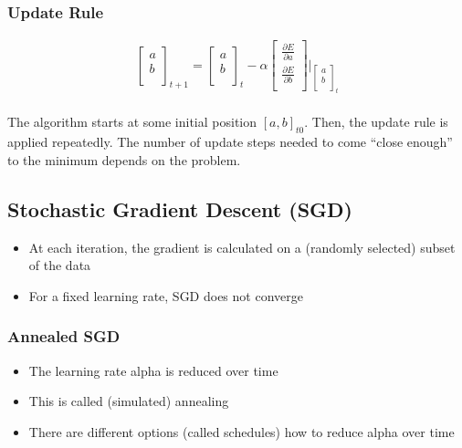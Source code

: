 \subsubsection{Update Rule}
\begin{align}
   \begin{bmatrix}
           a \\
           b \\
         \end{bmatrix}_{t+1} 
         =    \begin{bmatrix}
           a \\
           b \\
         \end{bmatrix}_{t} - \alpha 
         \begin{bmatrix}
           \frac{\partial E}{\partial a} \\
           \frac{\partial E}{\partial b} \\
         \end{bmatrix} \Big\rvert _{\begin{bmatrix}
           a \\
           b \\
         \end{bmatrix}_{t} }
  \end{align}
\\
The algorithm starts at some initial position $[a, b]_{t0}$. 
Then, the update rule is applied repeatedly. 
The number of update steps needed to come ``close enough'' to the minimum depends on the problem.

\subsection{Stochastic Gradient Descent (SGD)}
\begin{itemize}
    \item At each iteration, the gradient is calculated on a (randomly selected) subset of the data
    \item For a fixed learning rate, SGD does not converge
\end{itemize}

\subsubsection{Annealed SGD}
\begin{itemize}
    \item The learning rate alpha is reduced over time
    \item This is called (simulated) annealing
    \item There are different options (called schedules) how to reduce alpha over time
\end{itemize}

